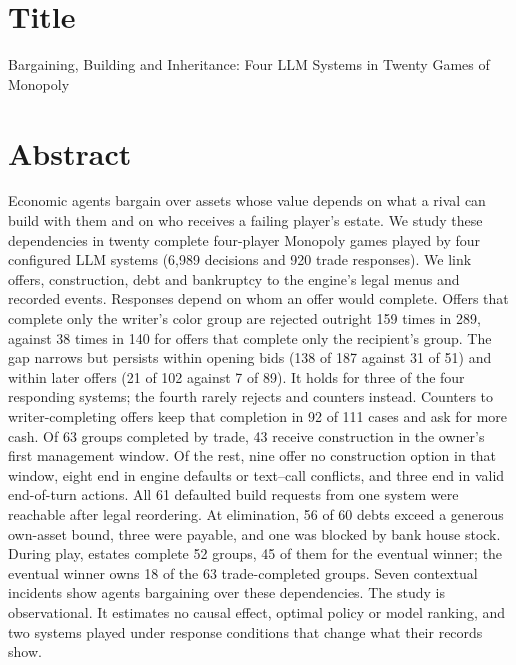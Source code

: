 
\section*{Title}
Bargaining, Building and Inheritance: Four LLM Systems in Twenty Games of Monopoly

\section*{Abstract}
Economic agents bargain over assets whose value depends on what a rival can build with them and on who receives a failing player's estate. We study these dependencies in twenty complete four-player Monopoly games played by four configured LLM systems (6,989 decisions and 920 trade responses). We link offers, construction, debt and bankruptcy to the engine's legal menus and recorded events. Responses depend on whom an offer would complete. Offers that complete only the writer's color group are rejected outright 159 times in 289, against 38 times in 140 for offers that complete only the recipient's group. The gap narrows but persists within opening bids (138 of 187 against 31 of 51) and within later offers (21 of 102 against 7 of 89). It holds for three of the four responding systems; the fourth rarely rejects and counters instead. Counters to writer-completing offers keep that completion in 92 of 111 cases and ask for more cash. Of 63 groups completed by trade, 43 receive construction in the owner's first management window. Of the rest, nine offer no construction option in that window, eight end in engine defaults or text--call conflicts, and three end in valid end-of-turn actions. All 61 defaulted build requests from one system were reachable after legal reordering. At elimination, 56 of 60 debts exceed a generous own-asset bound, three were payable, and one was blocked by bank house stock. During play, estates complete 52 groups, 45 of them for the eventual winner; the eventual winner owns 18 of the 63 trade-completed groups. Seven contextual incidents show agents bargaining over these dependencies. The study is observational. It estimates no causal effect, optimal policy or model ranking, and two systems played under response conditions that change what their records show.

